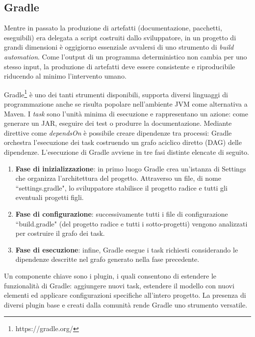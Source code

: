 \subsection{Gradle}

Mentre in passato la produzione di artefatti (documentazione, pacchetti, eseguibili) era delegata a script costruiti dallo sviluppatore, in un progetto di grandi dimensioni è oggigiorno essenziale avvalersi di uno strumento di \textit{build automation}. Come l'output di un programma deterministico non cambia per uno stesso input, la produzione di artefatti deve essere consistente e riproducibile riducendo al minimo l'intervento umano. 

Gradle\footnote{https://gradle.org/} è uno dei tanti strumenti disponibili, supporta diversi linguaggi di programmazione anche se risulta popolare nell'ambiente JVM come alternativa a Maven. I \textit{task} sono l'unità minima di esecuzione e rappresentano un azione: come generare un JAR, eseguire dei test o produrre la documentazione. Mediante direttive come \textit{dependsOn} è possibile creare dipendenze tra processi: Gradle orchestra l'esecuzione dei task costruendo un grafo aciclico diretto (DAG) delle dipendenze. L'esecuzione di Gradle avviene in tre fasi distinte elencate di seguito.
\begin{enumerate}
	\item \textbf{Fase di inizializzazione}: in primo luogo Gradle crea un'istanza di Settings che organizza l'architettura del progetto. Attraverso un file, di nome ``settings.gradle", lo sviluppatore stabilisce il progetto radice e tutti gli eventuali progetti figli. 
	\item \textbf{Fase di configurazione}: successivamente tutti i file di configurazione ``build\-.\-gradle" (del progetto radice e tutti i sotto-progetti) vengono analizzati per costruire il grafo dei task.
	\item \textbf{Fase di esecuzione}: infine, Gradle esegue i task richiesti considerando le dipendenze descritte nel grafo generato nella fase precedente.
\end{enumerate}


Un componente chiave sono i plugin, i quali consentono di estendere le funzionalità di Gradle: aggiungere nuovi task, estendere il modello con nuovi elementi ed applicare configurazioni specifiche all'intero progetto. La presenza di diversi plugin base e creati dalla comunità rende Gradle uno strumento versatile.

